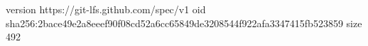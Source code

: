 version https://git-lfs.github.com/spec/v1
oid sha256:2bace49e2a8eeef90f08cd52a6cc65849de3208544f922afa3347415fb523859
size 492
